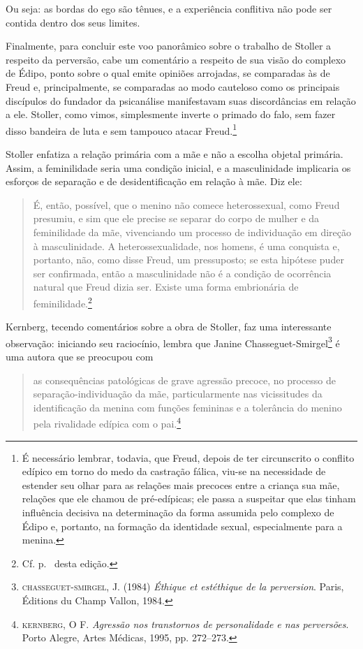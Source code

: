 Ou seja: as bordas do ego são tênues, e a experiência conflitiva não
pode ser contida dentro dos seus limites.

Finalmente, para concluir este voo panorâmico sobre o trabalho de
Stoller a respeito da perversão, cabe um comentário a respeito de sua
visão do complexo de Édipo, ponto sobre o qual emite opiniões arrojadas,
se comparadas às de Freud e, principalmente, se comparadas ao modo
cauteloso como os principais discípulos do fundador da psicanálise
manifestavam suas discordâncias em relação a ele. Stoller, como vimos,
simplesmente inverte o primado do falo, sem fazer disso bandeira de luta
e sem tampouco atacar Freud.\footnote{É necessário lembrar, todavia, que
  Freud, depois de ter circunscrito o conflito edípico em torno do medo
  da castração fálica, viu-se na necessidade de estender seu olhar para
  as relações mais precoces entre a criança sua mãe, relações que ele
  chamou de pré-edípicas; ele passa a suspeitar que elas tinham
  influência decisiva na determinação da forma assumida pelo complexo de
  Édipo e, portanto, na formação da identidade sexual, especialmente
  para a menina.}

Stoller enfatiza a relação primária com a mãe e não a escolha objetal
primária. Assim, a feminilidade seria uma condição inicial, e a
masculinidade implicaria os esforços de separação e de desidentificação
em relação à mãe. Diz ele:

\begin{quote}
É, então, possível, que o menino não comece heterossexual, como Freud
presumiu, e sim que ele precise se separar do corpo de mulher e da
feminilidade da mãe, vivenciando um processo de individuação em direção
à masculinidade. A heterossexualidade, nos homens, é uma conquista e,
portanto, não, como disse Freud, um pressuposto; se esta hipótese puder
ser confirmada, então a masculinidade não é a condição de ocorrência
natural que Freud dizia ser. Existe uma forma embrionária de
feminilidade.\footnote{Cf. p.~ desta edição.}
\end{quote}

Kernberg, tecendo comentários sobre a obra de Stoller, faz uma
interessante observação: iniciando seu raciocínio, lembra que Janine
Chasseguet-Smirgel\footnote{\textsc{chasseguet-smirgel}, J. (1984)
  \emph{Éthique et estéthique de la perversion}. Paris, Éditions du
  Champ Vallon, 1984.} é uma autora que se preocupou com

\begin{quote}
as consequências patológicas de grave agressão precoce, no processo de
separação-individuação da mãe, particularmente nas vicissitudes da
identificação da menina com funções femininas e a tolerância do menino
pela rivalidade edípica com o pai.\footnote{\textsc{kernberg}, O F.
  \emph{Agressão nos transtornos de personalidade e nas perversões}.
  Porto Alegre, Artes Médicas, 1995, pp. 272--273.}
\end{quote}


